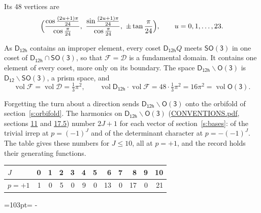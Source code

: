 \documentclass[10pt,a4paper]{article}
\newcommand{\needspace}[1]{\par\penalty-100\begingroup\dimen0=#1\relax\dimen2=\pagegoal
  \advance\dimen2-\pagetotal\ifdim\dimen0>\dimen2\relax\ifdim\dimen2>0pt\vfil\break\fi\fi
  \endgroup}
\numberwithin{equation}{section}
\newcommand{\grp}[1]{\mathsf{#1}}
\newcommand{\vol}{\operatorname{vol}}
\newcommand{\fcell}{\mathcal{D}}
\newcommand{\fdomain}{\mathcal{F}}
\begin{document}
\leavevmode\label{n:local.vertex.u}Its 48 vertices are
\begin{equation}\label{e:prism}\Bigl(\frac{\cos\frac{(2u+1)\pi}{24}}{\cos\frac{\pi}{24}},\ \frac{\sin\frac{(2u+1)\pi}{24}}{\cos\frac{\pi}{24}},\ \pm\tan\frac{\pi}{24}\Bigr),\qquad u = 0, 1, \dots, 23.\end{equation}

\leavevmode\label{n:set.fundamental}As $\grp{D_{12h}}$ contains an improper element, every coset $\grp{D_{12h}}Q$ meets \href{SO3.pdf}{$\grp{SO(3)}$} in one coset of $\grp{D_{12h}} \cap \grp{SO(3)}$, so that $\fdomain = \fcell$ is a fundamental domain. It contains one element of every coset, more only on its boundary.
The space $\grp{D_{12h}}\backslash\grp{O(3)}$ is $\grp{D_{12}}\backslash\grp{SO(3)}$, a prism space, and
\begin{equation}\label{e:volume}\vol\fdomain = \vol\fcell = \tfrac{1}{3}\pi^2,\qquad \vol\grp{D_{12h}}\cdot\vol\fdomain = 48\cdot \tfrac{1}{3}\pi^2 = 16\pi^2 = \vol\grp{O(3)}.\end{equation}

Forgetting the turn about a direction sends $\grp{D_{12h}}\backslash\grp{O(3)}$ onto the orbifold of section~\ref{s:orbifold}.
The harmonics on $\grp{D_{12h}}\backslash\grp{O(3)}$ (\href{../../CONVENTIONS.pdf}{CONVENTIONS.pdf}, sections \href{../../CONVENTIONS.pdf\#conv.11}{11} and \href{../../CONVENTIONS.pdf\#conv.17.5}{17.5}) number $2J + 1$ for each vector of section~\ref{s:bases}: of the trivial irrep at $p = (-1)^J$ and of the determinant character at $p = -(-1)^J$. The table gives these numbers for $J \le 10$, all at $p = +1$, and the record holds their generating functions.
{\small\setlength{\tabcolsep}{4pt}\begin{longtable}{@{}lrrrrrrrrrrr@{}}\toprule
$J$ & 0 & 1 & 2 & 3 & 4 & 5 & 6 & 7 & 8 & 9 & 10\\\midrule\endhead
\bottomrule\endfoot\endlastfoot
$p = +1$ & 1 & 0 & 5 & 0 & 9 & 0 & 13 & 0 & 17 & 0 & 21\\
\bottomrule\end{longtable}}
\needspace{103pt}
\end{document}
